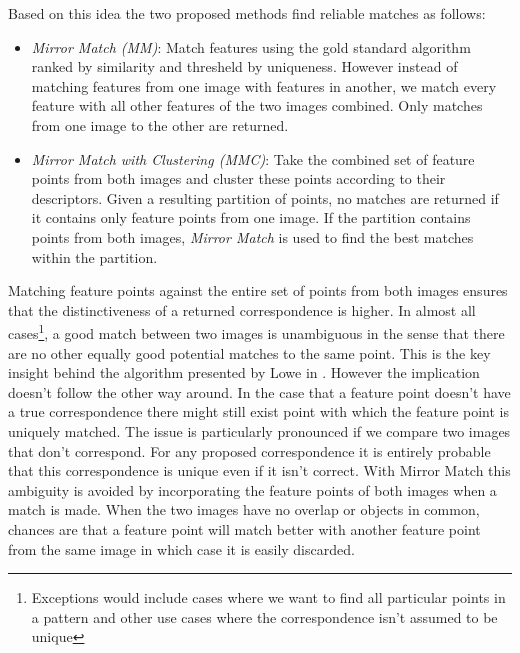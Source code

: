 \documentclass{article}
\begin{document}
Based on this idea the two proposed methods find reliable matches as 
follows:
\begin{itemize}
\item[]{\emph{Mirror Match (MM)}: Match features using the gold standard 
		algorithm\cite[p. 114]{multipleView} ranked by similarity and 
		thresheld by uniqueness\cite{lowe2004sift}.  However instead of 
		matching features from one image with features in another, we 
	match every feature with all other features of the two images 
combined. Only matches from one image to the other are returned.}
\item[]{\emph{Mirror Match with Clustering (MMC)}: Take the combined set 
		of feature points from both images and cluster these points 
		according to their descriptors. Given a resulting partition of 
		points, no matches are returned if it contains only feature 
	points from one image. If the partition contains points from both 
images, \emph{Mirror Match} is used to find the best matches within the 
partition.}
\end{itemize}

Matching feature points against the entire set of points from both 
images ensures that the distinctiveness of a returned correspondence is 
higher. In almost all cases\footnote{Exceptions would include cases 
where we want to find all particular points in a pattern and other use 
cases where the correspondence isn't assumed to be unique}, a good match 
between two images is unambiguous in the sense that there are no other 
equally good potential matches to the same point.  This is the key 
insight behind the algorithm presented by Lowe in \cite{lowe2004sift}.  
However the implication doesn't follow the other way around. In the case 
that a feature point doesn't have a true correspondence there might 
still exist point with which the feature point is uniquely matched. The 
issue is particularly pronounced if we compare two images that don't 
correspond. For any proposed correspondence it is entirely probable that 
this correspondence is unique even if it isn't correct. With Mirror 
Match this ambiguity is avoided by incorporating the feature points of 
both images when a match is made. When the two images have no overlap or 
objects in common, chances are that a feature point will match better 
with another feature point from the same image in which case it is 
easily discarded.
\end{document}
